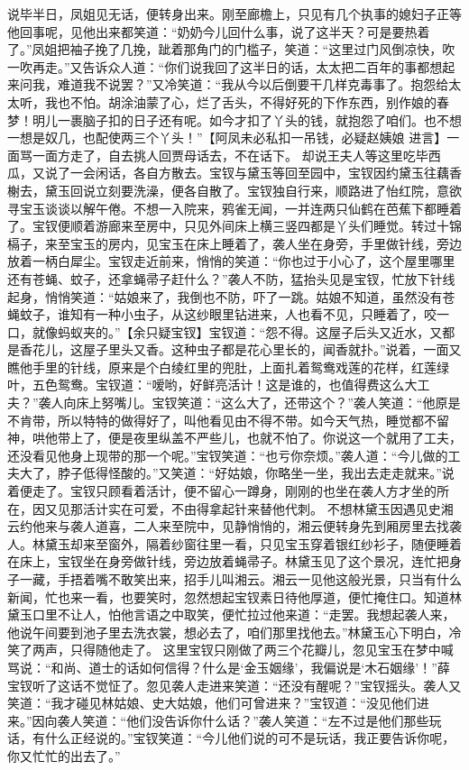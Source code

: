 \documentclass[12pt,oneside]{book}
\begin{document}
说毕半日，凤姐见无话，便转身出来。刚至廊檐上，只见有几个执事的媳妇子正等他回事呢，见他出来都笑道：“奶奶今儿回什么事，说了这半天？可是要热着了。”凤姐把袖子挽了几挽，跐着那角门的门槛子，笑道：“这里过门风倒凉快，吹一吹再走。”又告诉众人道：“你们说我回了这半日的话，太太把二百年的事都想起来问我，难道我不说罢？”又冷笑道：“我从今以后倒要干几样克毒事了。抱怨给太太听，我也不怕。胡涂油蒙了心，烂了舌头，不得好死的下作东西，别作娘的春梦！明儿一裹脑子扣的日子还有呢。如今才扣了丫头的钱，就抱怨了咱们。也不想一想是奴几，也配使两三个丫头！”【阿凤未必私扣一吊钱，必疑赵姨娘
进言】一面骂一面方走了，自去挑人回贾母话去，不在话下。
却说王夫人等这里吃毕西瓜，又说了一会闲话，各自方散去。宝钗与黛玉等回至园中，宝钗因约黛玉往藕香榭去，黛玉回说立刻要洗澡，便各自散了。宝钗独自行来，顺路进了怡红院，意欲寻宝玉谈谈以解午倦。不想一入院来，鸦雀无闻，一并连两只仙鹤在芭蕉下都睡着了。宝钗便顺着游廊来至房中，只见外间床上横三竖四都是丫头们睡觉。转过十锦槅子，来至宝玉的房内，见宝玉在床上睡着了，袭人坐在身旁，手里做针线，旁边放着一柄白犀尘。宝钗走近前来，悄悄的笑道：“你也过于小心了，这个屋里哪里还有苍蝇、蚊子，还拿蝇帚子赶什么？”袭人不防，猛抬头见是宝钗，忙放下针线起身，悄悄笑道：“姑娘来了，我倒也不防，吓了一跳。姑娘不知道，虽然没有苍蝇蚊子，谁知有一种小虫子，从这纱眼里钻进来，人也看不见，只睡着了，咬一口，就像蚂蚁夹的。”【余只疑宝钗】宝钗道：“怨不得。这屋子后头又近水，又都是香花儿，这屋子里头又香。这种虫子都是花心里长的，闻香就扑。”说着，一面又瞧他手里的针线，原来是个白绫红里的兜肚，上面扎着鸳鸯戏莲的花样，红莲绿叶，五色鸳鸯。宝钗道：“嗳哟，好鲜亮活计！这是谁的，也值得费这么大工夫？”袭人向床上努嘴儿。宝钗笑道：“这么大了，还带这个？”袭人笑道：“他原是不肯带，所以特特的做得好了，叫他看见由不得不带。如今天气热，睡觉都不留神，哄他带上了，便是夜里纵盖不严些儿，也就不怕了。你说这一个就用了工夫，还没看见他身上现带的那一个呢。”宝钗笑道：“也亏你奈烦。”袭人道：“今儿做的工夫大了，脖子低得怪酸的。”又笑道：“好姑娘，你略坐一坐，我出去走走就来。”说着便走了。宝钗只顾看着活计，便不留心一蹲身，刚刚的也坐在袭人方才坐的所在，因又见那活计实在可爱，不由得拿起针来替他代刺。
不想林黛玉因遇见史湘云约他来与袭人道喜，二人来至院中，见静悄悄的，湘云便转身先到厢房里去找袭人。林黛玉却来至窗外，隔着纱窗往里一看，只见宝玉穿着银红纱衫子，随便睡着在床上，宝钗坐在身旁做针线，旁边放着蝇帚子。林黛玉见了这个景况，连忙把身子一藏，手捂着嘴不敢笑出来，招手儿叫湘云。湘云一见他这般光景，只当有什么新闻，忙也来一看，也要笑时，忽然想起宝钗素日待他厚道，便忙掩住口。知道林黛玉口里不让人，怕他言语之中取笑，便忙拉过他来道：“走罢。我想起袭人来，他说午间要到池子里去洗衣裳，想必去了，咱们那里找他去。”林黛玉心下明白，冷笑了两声，只得随他走了。
这里宝钗只刚做了两三个花瓣儿，忽见宝玉在梦中喊骂说：“和尚、道士的话如何信得？什么是‘金玉姻缘’，我偏说是‘木石姻缘’！”薛宝钗听了这话不觉怔了。忽见袭人走进来笑道：“还没有醒呢？”宝钗摇头。袭人又笑道：“我才碰见林姑娘、史大姑娘，他们可曾进来？”宝钗道：“没见他们进来。”因向袭人笑道：“他们没告诉你什么话？”袭人笑道：“左不过是他们那些玩话，有什么正经说的。”宝钗笑道：“今儿他们说的可不是玩话，我正要告诉你呢，你又忙忙的出去了。”
\end{document}
